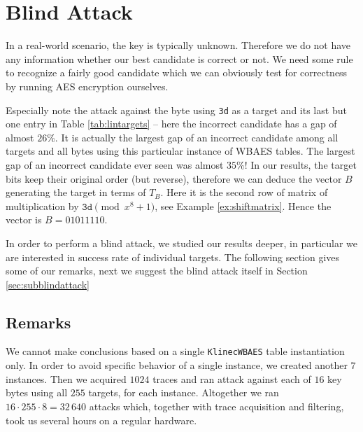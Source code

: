 \section{Blind Attack}
\label{sec:blindattack}

In a real-world scenario, the key is typically unknown. Therefore we do not have any information whether our best candidate is correct or not. We need some rule to recognize a fairly good candidate which we can obviously test for correctness by running AES encryption ourselves.

\begin{remark}
\label{rem:false}
	Especially note the attack against the  byte using {\tt 3d} as a target and its last but one entry in Table \ref{tab:lintargets} -- here the incorrect candidate has a gap of almost $26\%$. It is actually the largest gap of an incorrect candidate among all targets and all bytes using this particular instance of WBAES tables. The largest gap of an incorrect candidate ever seen was almost $35\%$!
	In our results, the target bits keep their original order (but reverse), therefore we can deduce the vector $B$ generating the target in terms of $T_B$. Here it is the second row of matrix of multiplication by $\texttt{3d}\pmod{x^8+1}$, see Example \ref{ex:shiftmatrix}. Hence the vector is $B = 01011110$.
\end{remark}

In order to perform a blind attack, we studied our results deeper, in particular we are interested in success rate of individual targets. The following section gives some of our remarks, next we suggest the blind attack itself in Section \ref{sec:subblindattack}



\subsection{Remarks}
\label{sec:remarks}

We cannot make conclusions based on a single {\tt KlinecWBAES} table instantiation only. In order to avoid specific behavior of a single instance, we created another $7$ instances. Then we acquired $1024$ traces and ran attack against each of $16$ key bytes using all $255$ targets, for each instance. Altogether we ran $16\cdot255\cdot8=32\,640$ attacks which, together with trace acquisition and filtering, took us several hours on a regular hardware.

